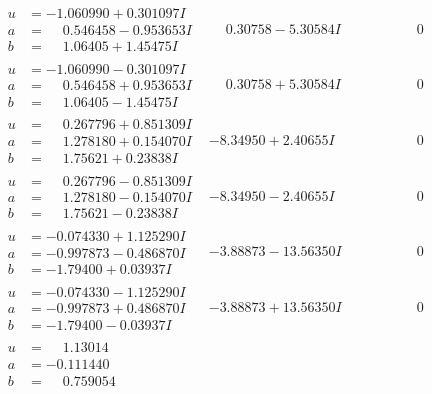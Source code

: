 \documentclass[1p]{elsarticle_modified}
\theoremstyle{definition}
\begin{document}
$$\begin{array}{c|c|c}
\begin{aligned}
u &= -1.060990 + 0.301097 I \\
a &= \phantom{-}0.546458 - 0.953653 I \\
b &= \phantom{-}1.06405 + 1.45475 I\end{aligned}
 & \phantom{-}0.30758 - 5.30584 I & \phantom{-0.000000 } 0 \\ \hline\begin{aligned}
u &= -1.060990 - 0.301097 I \\
a &= \phantom{-}0.546458 + 0.953653 I \\
b &= \phantom{-}1.06405 - 1.45475 I\end{aligned}
 & \phantom{-}0.30758 + 5.30584 I & \phantom{-0.000000 } 0 \\ \hline\begin{aligned}
u &= \phantom{-}0.267796 + 0.851309 I \\
a &= \phantom{-}1.278180 + 0.154070 I \\
b &= \phantom{-}1.75621 + 0.23838 I\end{aligned}
 & -8.34950 + 2.40655 I & \phantom{-0.000000 } 0 \\ \hline\begin{aligned}
u &= \phantom{-}0.267796 - 0.851309 I \\
a &= \phantom{-}1.278180 - 0.154070 I \\
b &= \phantom{-}1.75621 - 0.23838 I\end{aligned}
 & -8.34950 - 2.40655 I & \phantom{-0.000000 } 0 \\ \hline\begin{aligned}
u &= -0.074330 + 1.125290 I \\
a &= -0.997873 - 0.486870 I \\
b &= -1.79400 + 0.03937 I\end{aligned}
 & -3.88873 - 13.56350 I & \phantom{-0.000000 } 0 \\ \hline\begin{aligned}
u &= -0.074330 - 1.125290 I \\
a &= -0.997873 + 0.486870 I \\
b &= -1.79400 - 0.03937 I\end{aligned}
 & -3.88873 + 13.56350 I & \phantom{-0.000000 } 0 \\ \hline\begin{aligned}
u &= \phantom{-}1.13014\phantom{ +0.000000I} \\
a &= -0.111440\phantom{ +0.000000I} \\
b &= \phantom{-}0.759054\phantom{ +0.000000I}\end{aligned}

\end{array}$$
\end{document}
